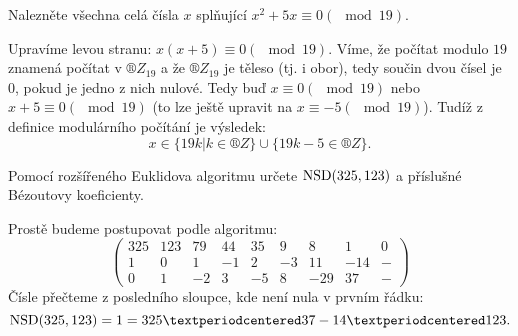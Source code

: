 \documentclass[12pt]{article}                   %
\let\oldmod=\mod
\def\mod{\!\!\!\!\oldmod}
\begin{document}
    \begin{priklad}[1.1]
        Nalezněte všechna celá čísla $x$ splňující $x^2 + 5x ≡ 0 (\mod 19)$.

        \begin{reseni}
            Upravíme levou stranu: $x(x + 5) ≡ 0 (\mod 19)$. Víme, že počítat modulo $19$ znamená počítat v $®Z_{19}$ a že $®Z_{19}$ je těleso (tj. i obor), tedy součin dvou čísel je 0, pokud je jedno z nich nulové. Tedy buď $x ≡ 0 (\mod 19)$ nebo $x + 5 ≡ 0 (\mod 19)$ (to lze ještě upravit na $x ≡ -5 (\mod 19)$). Tudíž z definice modulárního počítání je výsledek:
            $$ x \in \{19k | k \in ®Z\} \cup \{19k - 5 \in ®Z\}. $$
        \end{reseni}
    \end{priklad}

    \begin{priklad}[1.2]
        Pomocí rozšířeného Euklidova algoritmu určete $\operatorname{NSD}(325, 123)$ a příslušné Bézoutovy koeficienty.

        \begin{reseni}
            Prostě budeme postupovat podle algoritmu:
            $$ \begin{pmatrix}
                325 & 123 & 79 & 44 & 35 & 9 & 8 & 1 & 0 \\
                1 & 0 & 1 & -1 & 2 & -3 & 11 & -14 & -\\
                0 & 1 & -2 & 3 & -5 & 8 & -29 & 37 & -
            \end{pmatrix} $$
            Čísle přečteme z posledního sloupce, kde není nula v prvním řádku: 
            $$ \NSD(325, 123) = 1 = 325·37 - 14·123. $$
        \end{reseni}
    \end{priklad}

\pagebreak
\end{document}
